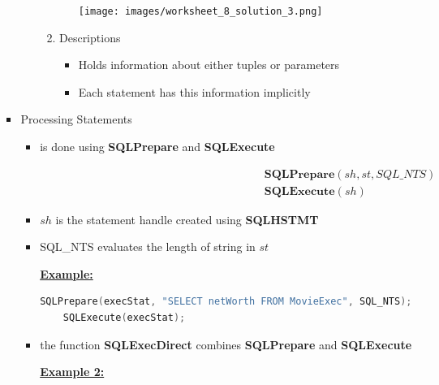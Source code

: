 \documentclass[12pt]{article}
\begin{document}
\begin{enumerate}[1.]
\begin{enumerate}[a)]
\begin{itemize}
\begin{itemize}
\begin{enumerate}[1.]
\begin{itemize}
                        \begin{center}
                        \texttt{[image: images/worksheet\_8\_solution\_3.png]}
                        \end{center}
                    \end{itemize}
                    \item Descriptions
                    \begin{itemize}
                        \item Holds information about either tuples or parameters
                        \item Each statement has this information implicitly
                    \end{itemize}
                \end{enumerate}
            \end{itemize}
            \item Processing Statements
            \begin{itemize}
                \item is done using \textbf{SQLPrepare} and \textbf{SQLExecute}

                \begin{align}
                    \textbf{SQLPrepare}(sh,st,SQL\_NTS)\\
                    \textbf{SQLExecute}(sh)
                \end{align}

                \item $sh$ is the statement handle created using \textbf{SQLHSTMT}
                \item SQL\_NTS evaluates the length of string in $st$

                \bigskip

                \underline{\textbf{Example:}}

                \bigskip

    \begin{lstlisting}[language=c]
    SQLPrepare(execStat, "SELECT netWorth FROM MovieExec", SQL_NTS);
    SQLExecute(execStat);
    \end{lstlisting}
                \item the function \textbf{SQLExecDirect} combines \textbf{SQLPrepare} and \textbf{SQLExecute}

                \bigskip

                \underline{\textbf{Example 2:}}


\end{itemize}
\end{itemize}
\end{enumerate}
\end{enumerate}
\end{document}
